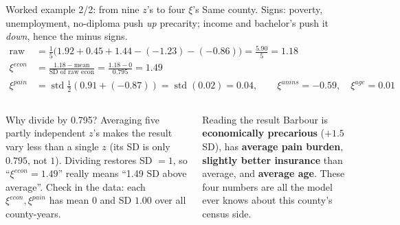 ﻿\documentclass[9pt,aspectratio=169]{beamer}
\begin{document}
\begin{frame}{Worked example 2/2: from nine $z$'s to four $\xi$'s}
 Same county. Signs: poverty, unemployment, no-diploma push \emph{up} precarity; income and bachelor's push it \emph{down}, hence the minus signs.
 \begin{align*}
  \text{raw econ}&=\tfrac15\big(1.92+0.45+1.44-(-1.23)-(-0.86)\big)=\tfrac{5.90}{5}=1.18\\
  \xi^{econ}&=\frac{1.18-\text{mean}}{\text{SD of raw econ}}=\frac{1.18-0}{0.795}=\mathbf{1.49}\\
  \xi^{pain}&=\operatorname{std}\tfrac12(0.91+(-0.87))=\operatorname{std}(0.02)=\mathbf{0.04},\qquad
  \xi^{unins}=\mathbf{-0.59},\quad \xi^{age}=\mathbf{0.01}
 \end{align*}
 \begin{columns}[T]
 \begin{block}{Why divide by 0.795?}\small
  Averaging five partly independent $z$'s makes the result vary less than a single $z$ (its SD is only $0.795$, not $1$). Dividing restores SD $=1$, so ``$\xi^{econ}=1.49$'' really means ``1.49 SD above average''. Check in the data: each $\xi^{econ},\xi^{pain}$ has mean $0$ and SD $1.00$ over all county-years.
 \end{block}
 \begin{block}{Reading the result}\small
  Barbour is \textbf{economically precarious} ($+1.5$ SD), has \textbf{average pain burden}, \textbf{slightly better insurance} than average, and \textbf{average age}. These four numbers are all the model ever knows about this county's census side.
 \end{block}
 \end{columns}
\end{frame}
\end{document}
